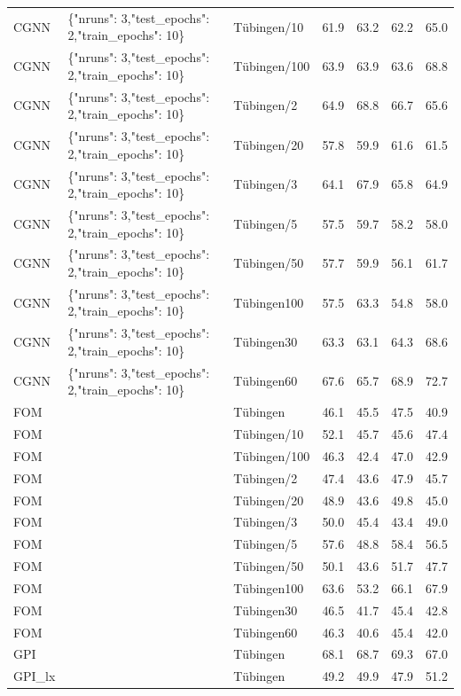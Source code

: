 \begin{tabular}{lllllll}
CGNN & \{"nruns": 3,"test\_epochs": 2,"train\_epochs": 10\} & Tübingen/10 & 61.9 & 63.2 & 62.2 & 65.0 \\
CGNN & \{"nruns": 3,"test\_epochs": 2,"train\_epochs": 10\} & Tübingen/100 & 63.9 & 63.9 & 63.6 & 68.8 \\
CGNN & \{"nruns": 3,"test\_epochs": 2,"train\_epochs": 10\} & Tübingen/2 & 64.9 & 68.8 & 66.7 & 65.6 \\
CGNN & \{"nruns": 3,"test\_epochs": 2,"train\_epochs": 10\} & Tübingen/20 & 57.8 & 59.9 & 61.6 & 61.5 \\
CGNN & \{"nruns": 3,"test\_epochs": 2,"train\_epochs": 10\} & Tübingen/3 & 64.1 & 67.9 & 65.8 & 64.9 \\
CGNN & \{"nruns": 3,"test\_epochs": 2,"train\_epochs": 10\} & Tübingen/5 & 57.5 & 59.7 & 58.2 & 58.0 \\
CGNN & \{"nruns": 3,"test\_epochs": 2,"train\_epochs": 10\} & Tübingen/50 & 57.7 & 59.9 & 56.1 & 61.7 \\
CGNN & \{"nruns": 3,"test\_epochs": 2,"train\_epochs": 10\} & Tübingen100 & 57.5 & 63.3 & 54.8 & 58.0 \\
CGNN & \{"nruns": 3,"test\_epochs": 2,"train\_epochs": 10\} & Tübingen30 & 63.3 & 63.1 & 64.3 & 68.6 \\
CGNN & \{"nruns": 3,"test\_epochs": 2,"train\_epochs": 10\} & Tübingen60 & 67.6 & 65.7 & 68.9 & 72.7 \\
FOM &  & Tübingen & 46.1 & 45.5 & 47.5 & 40.9 \\
FOM &  & Tübingen/10 & 52.1 & 45.7 & 45.6 & 47.4 \\
FOM &  & Tübingen/100 & 46.3 & 42.4 & 47.0 & 42.9 \\
FOM &  & Tübingen/2 & 47.4 & 43.6 & 47.9 & 45.7 \\
FOM &  & Tübingen/20 & 48.9 & 43.6 & 49.8 & 45.0 \\
FOM &  & Tübingen/3 & 50.0 & 45.4 & 43.4 & 49.0 \\
FOM &  & Tübingen/5 & 57.6 & 48.8 & 58.4 & 56.5 \\
FOM &  & Tübingen/50 & 50.1 & 43.6 & 51.7 & 47.7 \\
FOM &  & Tübingen100 & 63.6 & 53.2 & 66.1 & 67.9 \\
FOM &  & Tübingen30 & 46.5 & 41.7 & 45.4 & 42.8 \\
FOM &  & Tübingen60 & 46.3 & 40.6 & 45.4 & 42.0 \\
GPI &  & Tübingen & 68.1 & 68.7 & 69.3 & 67.0 \\
GPI\_lx &  & Tübingen & 49.2 & 49.9 & 47.9 & 51.2 \\

\end{tabular}
